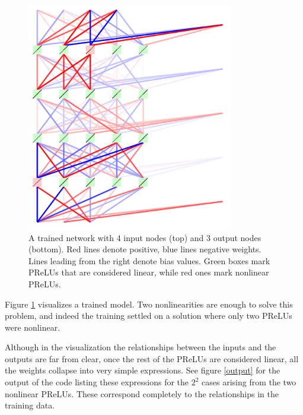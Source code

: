 \documentclass{article}[12pt]
\begin{document}
\begin{figure}[ht]
\centering
\includegraphics[height=10cm]{example}
\caption{A trained network with 4 input nodes (top) and 3 output nodes (bottom). Red lines denote positive, blue lines negative weights.
Lines leading from the right denote bias values. Green boxes mark PReLUs that are considered linear, while red ones mark nonlinear PReLUs.}
\label{fig}
\end{figure}

Figure \ref{fig} visualizes a trained model. Two nonlinearities are enough to solve this problem, and indeed the training
settled on a solution where only two PReLUs were nonlinear.

Although in the visualization the relationships between the inputs and the outputs are far from clear,
once the rest of the PReLUs are considered linear, all the weights collapse into very simple expressions.
See figure \ref{output} for the output of the code listing these expressions for the $2^2$ cases arising from the
two nonlinear PReLUs.
These correspond completely to the relationships in the training data.
\end{document}
